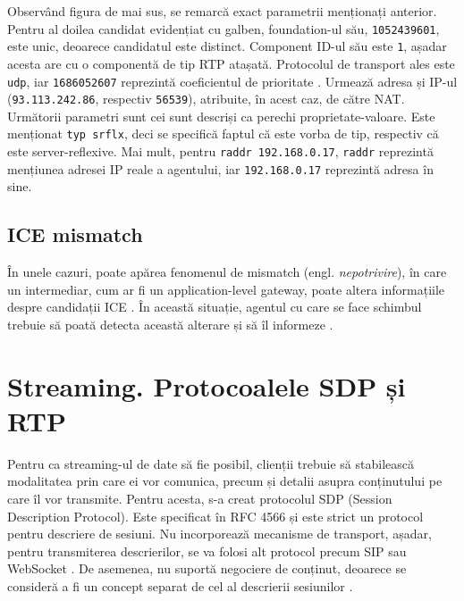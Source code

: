 \indent \par Observând figura de mai sus, se remarcă exact parametrii menționați anterior. Pentru al doilea candidat evidențiat cu galben, foundation-ul său, \texttt{1052439601}, este unic, deoarece candidatul este distinct. Component ID-ul său este \texttt{1}, așadar acesta are cu o componentă de tip RTP atașată. Protocolul de transport ales este \texttt{udp}, iar \texttt{1686052607} reprezintă coeficientul de prioritate . Urmează adresa și IP-ul (\texttt{93.113.242.86}, respectiv \texttt{56539}), atribuite, în acest caz, de către NAT. Următorii parametri sunt cei sunt descriși ca perechi proprietate-valoare. Este menționat \texttt{typ srflx}, deci se specifică faptul că este vorba de tip, respectiv că este server-reflexive. Mai mult, pentru \texttt{raddr 192.168.0.17}, \texttt{raddr} reprezintă mențiunea adresei IP reale a agentului, iar \texttt{192.168.0.17} reprezintă adresa în sine.

\subsection{ICE mismatch}
\indent \par În unele cazuri, poate apărea fenomenul de mismatch (engl. \textit{nepotrivire}), în care un intermediar, cum ar fi un application-level gateway, poate altera informațiile despre candidații ICE \cite{rfc8445}. În această situație, agentul cu care se face schimbul trebuie să poată detecta această alterare și să îl informeze \cite{rfc8445}.

\section{Streaming. Protocoalele SDP și RTP}
\label{sec:ch3sec3}
\indent \par Pentru ca streaming-ul de date să fie posibil, clienții trebuie să stabilească modalitatea prin care ei vor comunica, precum și detalii asupra conținutului pe care îl vor transmite. Pentru acesta, s-a creat protocolul SDP (Session Description Protocol). Este specificat în RFC 4566 și este strict un protocol pentru descriere de sesiuni. Nu incorporează mecanisme de transport, așadar, pentru transmiterea descrierilor, se va folosi alt protocol precum SIP sau WebSocket \cite{rfc4566}. De asemenea, nu suportă negociere de conținut, deoarece se consideră a fi un concept separat de cel al descrierii sesiunilor \cite{rfc4566}.

